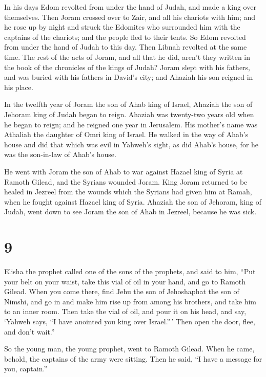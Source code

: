  In his days Edom revolted from under the hand of Judah,
and made a king over themselves.  Then Joram crossed over
to Zair, and all his chariots with him; and he rose up by night and
struck the Edomites who surrounded him with the captains of the
chariots; and the people fled to their tents.  So Edom
revolted from under the hand of Judah to this day. Then Libnah revolted
at the same time.  The rest of the acts of Joram, and all
that he did, aren't they written in the book of the chronicles of the
kings of Judah?  Joram slept with his fathers, and was
buried with his fathers in David's city; and Ahaziah his son reigned in
his place.

 In the twelfth year of Joram the son of Ahab king of
Israel, Ahaziah the son of Jehoram king of Judah began to reign.
 Ahaziah was twenty-two years old when he began to reign;
and he reigned one year in Jerusalem. His mother's name was Athaliah the
daughter of Omri king of Israel.  He walked in the way of
Ahab's house and did that which was evil in Yahweh's sight, as did
Ahab's house, for he was the son-in-law of Ahab's house.

 He went with Joram the son of Ahab to war against Hazael
king of Syria at Ramoth Gilead, and the Syrians wounded Joram.
 King Joram returned to be healed in Jezreel from the
wounds which the Syrians had given him at Ramah, when he fought against
Hazael king of Syria. Ahaziah the son of Jehoram, king of Judah, went
down to see Joram the son of Ahab in Jezreel, because he was sick.

\hypertarget{section-8}{%
\section{9}\label{section-8}}

 Elisha the prophet called one of the sons of the prophets,
and said to him, ``Put your belt on your waist, take this vial of oil in
your hand, and go to Ramoth Gilead.  When you come there,
find Jehu the son of Jehoshaphat the son of Nimshi, and go in and make
him rise up from among his brothers, and take him to an inner room.
 Then take the vial of oil, and pour it on his head, and
say, `Yahweh says, ``I have anointed you king over Israel.''\,' Then
open the door, flee, and don't wait.''

 So the young man, the young prophet, went to Ramoth Gilead.
 When he came, behold, the captains of the army were
sitting. Then he said, ``I have a message for you, captain.''

